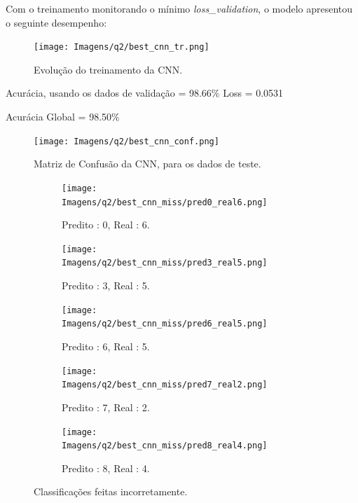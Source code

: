 \documentclass[12pt]{article}
\begin{document}
Com o treinamento monitorando o mínimo \textit{loss\_validation}, o modelo apresentou o seguinte desempenho:

\begin{figure}[H]
	\centering
	\texttt{[image: Imagens/q2/best\_cnn\_tr.png]}
	\caption{Evolução do treinamento da CNN.}
	\label{fig:best_cnn_tr}
\end{figure}
\begin{center}
	Acurácia, usando os dados de validação = 98.66\% \hspace{100px} Loss  = 0.0531 \\ 
	
\end{center}

\begin{center}
	Acurácia Global = 98.50\% 
\end{center}

\begin{figure}[H]
	\centering
	\texttt{[image: Imagens/q2/best\_cnn\_conf.png]}
	\caption{Matriz de Confusão da CNN, para os dados de teste.}
	\label{fig:best_cnn_conf}
\end{figure}

\begin{figure}[H]
	\centering
	\begin{subfigure}{0.25\linewidth}
		\centering
		\texttt{[image: Imagens/q2/best\_cnn\_miss/pred0\_real6.png]}
		\caption{Predito : 0, Real : 6.}
		\label{fig:pred0_real6}
	\end{subfigure}
	\hfill
	\begin{subfigure}{0.25\linewidth}
		\centering
		\texttt{[image: Imagens/q2/best\_cnn\_miss/pred3\_real5.png]}
		\caption{Predito : 3, Real : 5.}
		\label{fig:pred3_real5}
	\end{subfigure}
	\hfill
	\begin{subfigure}{0.25\linewidth}
		\centering
		\texttt{[image: Imagens/q2/best\_cnn\_miss/pred6\_real5.png]}
		\caption{Predito : 6, Real : 5.}
		\label{fig:pred6_real5}
	\end{subfigure}

	\begin{subfigure}{0.25\linewidth}
		\centering
		\texttt{[image: Imagens/q2/best\_cnn\_miss/pred7\_real2.png]}
		\caption{Predito : 7, Real : 2.}
		\label{fig:pred7_real2}
	\end{subfigure}
	\hspace{70px}
	\begin{subfigure}{0.25\linewidth}
		\centering
		\texttt{[image: Imagens/q2/best\_cnn\_miss/pred8\_real4.png]}
		\caption{Predito : 8, Real : 4.}
		\label{fig:pred8_real4}
	\end{subfigure}
	\caption{Classificações feitas incorretamente.}
	\label{fig:miss}
\end{figure}
\end{document}
